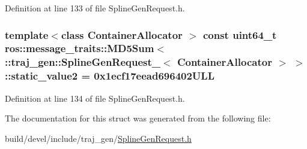 Definition at line 133 of file Spline\+Gen\+Request.\+h.

\subsubsection[{\texorpdfstring{static\+\_\+value2}{static_value2}}]{\setlength{\rightskip}{0pt plus 5cm}template$<$class Container\+Allocator $>$ const uint64\+\_\+t ros\+::message\+\_\+traits\+::\+M\+D5\+Sum$<$ \+::{\bf traj\+\_\+gen\+::\+Spline\+Gen\+Request\+\_\+}$<$ Container\+Allocator $>$ $>$\+::static\+\_\+value2 = 0x1ecf17eead696402\+U\+LL\hspace{0.3cm}{\ttfamily [static]}}\hypertarget{structros_1_1message__traits_1_1_m_d5_sum_3_01_1_1traj__gen_1_1_spline_gen_request___3_01_container_allocator_01_4_01_4_adb52a1a8a60320b333dfa188653c6a66}{}\label{structros_1_1message__traits_1_1_m_d5_sum_3_01_1_1traj__gen_1_1_spline_gen_request___3_01_container_allocator_01_4_01_4_adb52a1a8a60320b333dfa188653c6a66}


Definition at line 134 of file Spline\+Gen\+Request.\+h.



The documentation for this struct was generated from the following file\+:\begin{DoxyCompactItemize}
\item 
build/devel/include/traj\+\_\+gen/\hyperlink{_spline_gen_request_8h}{Spline\+Gen\+Request.\+h}\end{DoxyCompactItemize}
